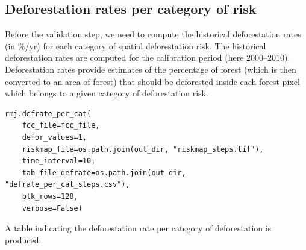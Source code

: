 \documentclass[paper=a4, 12pt, DIV=12]{scrartcl}
\begin{document}
\subsection{Deforestation rates per category of risk}
\label{sec:org3860418}

Before the validation step, we need to compute the historical deforestation rates (in \%/yr) for each category of spatial deforestation risk. The historical deforestation rates are computed for the calibration period (here 2000--2010). Deforestation rates provide estimates of the percentage of forest (which is then converted to an area of forest) that should be deforested inside each forest pixel which belongs to a given category of deforestation risk.

\begin{verbatim}
rmj.defrate_per_cat(
    fcc_file=fcc_file,
    defor_values=1,
    riskmap_file=os.path.join(out_dir, "riskmap_steps.tif"),
    time_interval=10,
    tab_file_defrate=os.path.join(out_dir, "defrate_per_cat_steps.csv"),
    blk_rows=128,
    verbose=False)
\end{verbatim}

A table indicating the deforestation rate per category of deforestation is produced:
\end{document}
